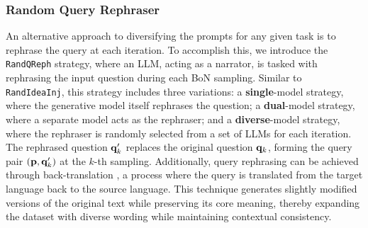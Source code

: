 \subsubsection{Random Query Rephraser}
\label{sec:RandQReph}
An alternative approach to diversifying the prompts for any given task is to rephrase the query at each iteration. To accomplish this, we introduce the \texttt{RandQReph} strategy, where an LLM, acting as a narrator, is tasked with rephrasing the input question during each BoN sampling. Similar to \texttt{RandIdeaInj}, this strategy includes three variations: a \textbf{single}-model strategy, where the generative model itself rephrases the question; a \textbf{dual}-model strategy, where a separate model acts as the rephraser; and a \textbf{diverse}-model strategy, where the rephraser is randomly selected from a set of LLMs for each iteration. The rephrased question $\mathbf{q}'_k$ replaces the original question $\mathbf{q}_k$, forming the query pair $(\mathbf{p}, \mathbf{q}'_k)$ at the $k$-th sampling. Additionally, query rephrasing can be achieved through back-translation \citep{beddiar2021dataexpansionusingtranslation}, a process where the query is translated from the target language back to the source language. This technique generates slightly modified versions of the original text while preserving its core meaning, thereby expanding the dataset with diverse wording while maintaining contextual consistency.


